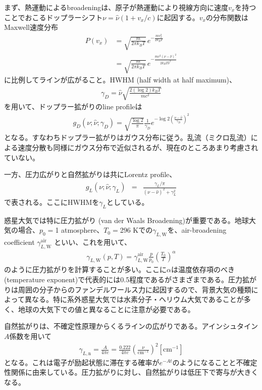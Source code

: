 まず、熱運動によるbroadeningは、原子が熱運動により視線方向に速度$v_x$を持つことでおこるドップラーシフト$\nu = \hat{\nu} ( 1 + v_x/c)$に起因する。$v_x$の分布関数はMaxwell速度分布
\begin{align}
P(v_x) &= \sqrt{\frac{m}{2 \pi k_B T}} \, e^{-\frac{m v_x^2}{2 k_B T}} \\
&= \sqrt{\frac{m}{2 \pi k_B T}} \, e^{-\frac{m c^2 (\nu - \hat{\nu})^2}{2 k_B T \hat{\nu}^2}} 
\label{eq:dopplerveldist}
\end{align}
に比例してラインが広がること。HWHM (half width at half maximum)、
\begin{eqnarray}
\gamma_D = \hat{\nu} \sqrt{\frac{2 (\log{2}) k_B T}{m c^2}}
\label{eq:dopplergamma}
\end{eqnarray}
を用いて、ドップラー拡がりのline profileは
\begin{eqnarray}
g_D(\nu; \hat{\nu}; \gamma_D) = \sqrt{\frac{\log{2}}{\pi}} \frac{1}{\gamma_D} e^{ - \log{2} \left( \frac{\nu - \hat{\nu}}{\gamma_D}\right)^2}
\label{eq:dopplerprofile}
\end{eqnarray}
となる。すなわちドップラー拡がりはガウス分布に従う。乱流（ミクロ乱流）による速度分散も同様にガウス分布で近似されるが、現在のところあまり考慮されていない。

一方、圧力広がりと自然拡がりは共にLorentz profile、
\begin{eqnarray}
g_L(\nu; \hat{\nu}; \gamma_L) &=& \frac{\gamma_L/\pi}{(\nu - \hat{\nu})^2  + \gamma_L^2}
\label{eq:lorentzprofile}
\end{eqnarray}
で表される。ここにHWHMを$\gamma_L$としている。

惑星大気では特に圧力拡がり (van der Waals Broadening)が重要である。地球大気の場合、$p_0=$1 atmosphere、$T_0=$296 Kでの$\gamma_{L, \mathrm{W}}$を、air-broadening coefficient $\gamma_{L, \mathrm{W}}^{\mathrm{air}}$ といい、これを用いて、
\begin{eqnarray}
\gamma_{L, \mathrm{W}}(p,T) = \gamma_{L, \mathrm{W}}^{\mathrm{air}} \frac{p}{p_0} \left( \frac{T_0}{T} \right)^\alpha
\label{eq:airtogen}
\end{eqnarray}
のように圧力拡がりを計算することが多い。ここに$\alpha$は温度依存項のべき(temperature exponent)で代表的には0.5程度であるがさまざまである。圧力拡がりは周囲の分子からのファンデルワールス力に起因するので、背景大気の種類によって異なる。特に系外惑星大気では水素分子・ヘリウム大気であることが多く、地球の大気下での値と異なることに注意が必要である。


自然拡がりは、不確定性原理からくるラインの広がりである。アインシュタイン$A$係数を用いて
\begin{eqnarray}
\gamma_{L, \mathrm{n}} = \frac{A}{4 \pi c} = \frac{0.222}{4 \pi c} \left( \frac{\nu}{\mathrm{cm^{-1}}} \right)^2 \mathrm{[cm^{-1}]}
\end{eqnarray}
となる。これは電子が励起状態に滞在する確率が$e^{-A t}$のようになることと不確定性関係に由来している。圧力拡がりに対し、自然拡がりは低圧下で寄与が大きくなる。

